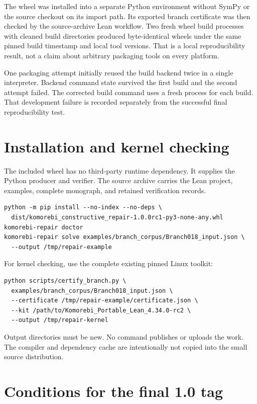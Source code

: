 The wheel was installed into a separate Python environment without SymPy or the source checkout on its import path. Its exported branch certificate was then checked by the source-archive Lean workflow. Two fresh wheel build processes with cleaned build directories produced byte-identical wheels under the same pinned build timestamp and local tool versions. That is a local reproducibility result, not a claim about arbitrary packaging tools on every platform.

One packaging attempt initially reused the build backend twice in a single interpreter. Backend command state survived the first build and the second attempt failed. The corrected build command uses a fresh process for each build. That development failure is recorded separately from the successful final reproducibility test.

\section{Installation and kernel checking}

The included wheel has no third-party runtime dependency. It supplies the Python producer and verifier. The source archive carries the Lean project, examples, complete monograph, and retained verification records.

\begin{Verbatim}[fontsize=\small,breaklines=true]
python -m pip install --no-index --no-deps \
  dist/komorebi_constructive_repair-1.0.0rc1-py3-none-any.whl
komorebi-repair doctor
komorebi-repair solve examples/branch_corpus/Branch018_input.json \
  --output /tmp/repair-example
\end{Verbatim}

For kernel checking, use the complete existing pinned Linux toolkit:

\begin{Verbatim}[fontsize=\small,breaklines=true]
python scripts/certify_branch.py \
  examples/branch_corpus/Branch018_input.json \
  --certificate /tmp/repair-example/certificate.json \
  --kit /path/to/Komorebi_Portable_Lean_4.34.0-rc2 \
  --output /tmp/repair-kernel
\end{Verbatim}

Output directories must be new. No command publishes or uploads the work. The compiler and dependency cache are intentionally not copied into the small source distribution.

\section{Conditions for the final 1.0 tag}

